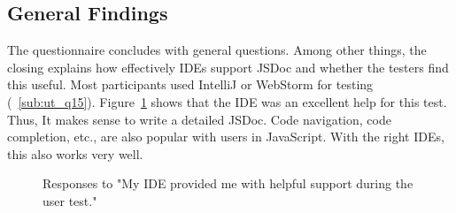 \subsection{General Findings} %
\label{sub:General Findings}
The questionnaire concludes with general questions. Among other things, the
closing explains how effectively IDEs support JSDoc and whether the testers
find this useful. Most participants used IntelliJ or WebStorm for testing
(~\ref{sub:ut_q15}). Figure~\ref{fig:usertest_q3} shows that the IDE was an excellent help for this test. Thus, It
makes sense to write a detailed JSDoc. Code navigation, code completion, etc.,
are also popular with users in JavaScript. With the right IDEs, this also works
very well.

\begin{figure}[H]
\centering
{}
\caption{Responses to "My IDE provided me with helpful support during the user
test."}
\label{fig:usertest_q3}
\end{figure}

